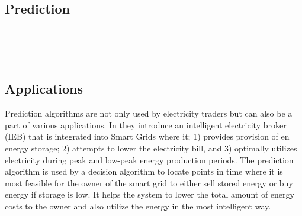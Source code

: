 \documentclass[twoside,11pt,openright]{report}
\begin{document}
\subsection{Prediction}

\\[0.5cm]

\\[0.5cm]

\\[0.5cm]


\subsection{Applications}
Prediction algorithms are not only used by electricity traders but can also be a part of various applications. In \cite{22} they introduce an intelligent electricity broker (IEB) that is integrated into Smart Grids where it; 1) provides provision of en energy storage; 2) attempts to lower the electricity bill, and 3) optimally utilizes electricity during peak and low-peak energy production periods. The prediction algorithm is used by a decision algorithm to locate points in time where it is most feasible for the owner of the smart grid to either sell stored energy or buy energy if storage is low. It helps the system to lower the total amount of energy costs to the owner and also utilize the energy in the most intelligent way.
\end{document}
